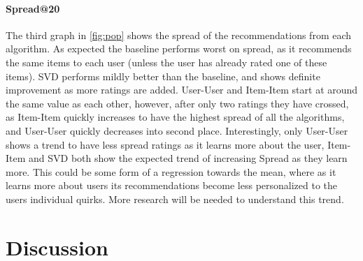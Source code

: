 \documentclass[letterpaper]{sig-alternate}
\begin{document}
  \paragraph{Spread@20}
  The third graph in \ref{fig:pop} shows the spread of the recommendations from each algorithm.
  As expected the baseline performs worst on spread, as it recommends the same items to each user (unless the user has already rated one of these items).
  SVD performs mildly better than the baseline, and shows definite improvement as more ratings are added.
  User-User and Item-Item start at around the same value as each other, however, after only two ratings they have crossed, as Item-Item quickly increases to have the highest spread of all the algorithms, and User-User quickly decreases into second place.
  Interestingly, only User-User shows a trend to have less spread ratings as it learns more about the user, Item-Item and SVD both show the expected trend of increasing Spread as they learn more.
  This could be some form of a regression towards the mean, where as it learns more about users its recommendations become less personalized to the users individual quirks.
  More research will be needed to understand this trend.
  

\section{Discussion}

    
\end{document}
